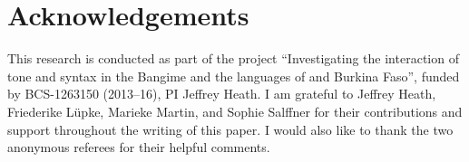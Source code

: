 \documentclass[output=paper,
modfonts
]{langscibook}
\begin{document}
\section*{Acknowledgements}

This research is conducted as part of the project “Investigating the interaction of tone and syntax in the Bangime and the  languages of  and Burkina Faso”, funded by BCS-1263150 (2013--16), PI Jeffrey Heath. I am grateful to Jeffrey Heath, Friederike Lüpke, Marieke Martin, and Sophie Salffner for their contributions and support throughout the writing of this paper. I would also like to thank the two anonymous referees for their helpful comments.
 
{\sloppy
\printbibliography[heading=subbibliography,notkeyword=this]
}
\end{document}
